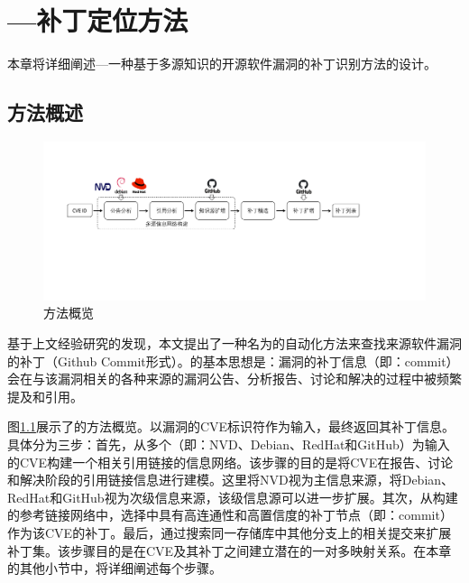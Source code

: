 \chapter{\tool ---补丁定位方法}

本章将详细阐述\tool ---一种基于多源知识的开源软件漏洞的补丁识别方法的设计。

\section{方法概述}
\begin{figure}[h]
    \centering
    \includegraphics[scale=0.40]{res/overview.pdf}
    \caption{\tool 方法概览}\label{fig:overview}
\end{figure}

基于上文经验研究的发现，本文提出了一种名为\tool 的自动化方法来查找来源软件漏洞的补丁（Github Commit形式）。\tool 的基本思想是：漏洞的补丁信息（即：commit）会在与该漏洞相关的各种来源的漏洞公告、分析报告、讨论和解决的过程中被频繁提及和引用。

图\ref{fig:overview}展示了\tool 的方法概览。\tool 以漏洞的CVE标识符作为输入，最终返回其补丁信息。具体分为三步：首先，\tool 从多个（即：NVD、Debian\cite{debian}、RedHat\cite{redhat}和GitHub）为输入的CVE构建一个相关引用链接的信息网络。该步骤的目的是将CVE在报告、讨论和解决阶段的引用链接信息进行建模。这里将NVD视为主信息来源，将Debian、RedHat和GitHub视为次级信息来源，该级信息源可以进一步扩展。其次，\tool 从构建的参考链接网络中，选择中具有高连通性和高置信度的补丁节点（即：commit）作为该CVE的补丁。最后，\tool 通过搜索同一存储库中其他分支上的相关提交来扩展补丁集。该步骤目的是在CVE及其补丁之间建立潜在的一对多映射关系。在本章的其他小节中，将详细阐述每个步骤。


